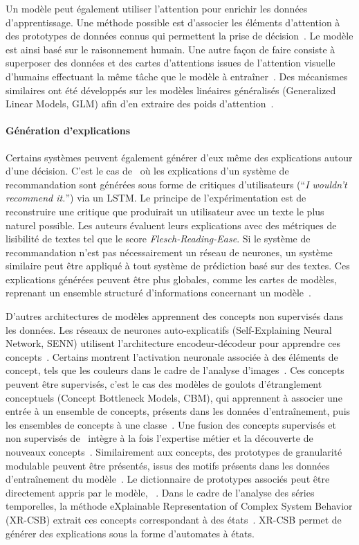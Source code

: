 Un modèle peut également utiliser l'attention pour enrichir les données d'apprentissage. Une méthode possible est d'associer les éléments d'attention à des prototypes de données connus qui permettent la prise de décision~\cite{Barnett2021}. Le modèle est ainsi basé sur le raisonnement humain. Une autre façon de faire consiste à superposer des données et des cartes d'attentions issues de l'attention visuelle d'humains effectuant la même tâche que le modèle à entraîner~\cite{Obeso2022}.
Des mécanismes similaires ont été développés sur les modèles linéaires généralisés (Generalized Linear Models, GLM) afin d'en extraire des poids d'attention~\cite{Richman2021}.

\paragraph{Génération d'explications}
Certains systèmes peuvent également générer d'eux même des explications autour d'une décision. C'est le cas de~\cite{Costa2018} où les explications d'un système de recommandation sont générées sous forme de critiques d'utilisateurs (``\textit{I wouldn’t recommend it.}'') via un LSTM. Le principe de l'expérimentation est de reconstruire une critique que produirait un utilisateur avec un texte le plus naturel possible. Les auteurs évaluent leurs explications avec des métriques de lisibilité de textes tel que le score \textit{Flesch-Reading-Ease}. Si le système de recommandation n'est pas nécessairement un réseau de neurones, un système similaire peut être appliqué à tout système de prédiction basé sur des textes.
Ces explications générées peuvent être plus globales, comme les cartes de modèles, reprenant un ensemble structuré d'informations concernant un modèle~\cite{Fang2020}.

D'autres architectures de modèles apprennent des concepts non supervisés dans les données. Les réseaux de neurones auto-explicatifs (Self-Explaining Neural Network, SENN) utilisent l'architecture encodeur-décodeur pour apprendre ces concepts~\cite{AlvarezMelis2018}. Certains montrent l'activation neuronale associée à des éléments de concept, tels que les couleurs dans le cadre de l'analyse d'images~\cite{Barberan2022}.
Ces concepts peuvent être supervisés, c'est le cas des modèles de goulots d'étranglement conceptuels (Concept Bottleneck Models, CBM), qui apprennent à associer une entrée à un ensemble de concepts, présents dans les données d'entraînement, puis les ensembles de concepts à une classe~\cite{Koh2020}.
Une fusion des concepts supervisés et non supervisés de~\cite{AlvarezMelis2018,Koh2020} intègre à la fois l'expertise métier et la découverte de nouveaux concepts~\cite{Sawada2022}.
Similairement aux concepts, des prototypes de granularité modulable peuvent être présentés, issus des motifs présents dans les données d'entraînement du modèle~\cite{Uehara2020}. Le dictionnaire de prototypes associés peut être directement appris par le modèle, ~\cite{Uehara2021,Yun2021}. Dans le cadre de l'analyse des séries temporelles, la méthode eXplainable Representation of Complex System Behavior (XR-CSB) extrait ces concepts correspondant à des états~\cite{Kaadoud2022}. XR-CSB permet de générer des explications sous la forme d'automates à états.


